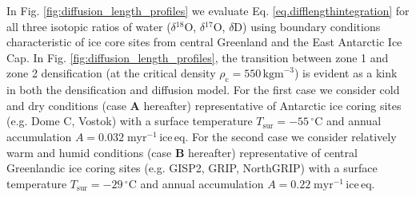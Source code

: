 \documentclass[11pt, draftcls, onecolumn]{IEEEtran} %
\numberwithin{equation}{section}
\numberwithin{table}{section}
\numberwithin{figure}{section}
\newcommand{\delOx}{$\delta{}^{18}\mathrm{O}$}
\newcommand{\delOxb}{$\delta{}^{17}\mathrm{O}$}
\newcommand{\delD}{$\delta\mathrm{D}$}
\begin{document}
In Fig. \ref{fig:diffusion_length_profiles} we evaluate Eq. \ref{eq.difflengthintegration} for all three isotopic ratios 
of water (\delOx, \delOxb, \delD) using boundary conditions characteristic of ice core sites from central Greenland
and the East Antarctic Ice Cap.
In Fig. \ref{fig:diffusion_length_profiles},
the transition between zone 1 and zone 2 densification (at the critical density $\rho_\mathrm{c} = 550\, \mathrm{kg m}^{-3}$) is 
evident as a kink in both the densification and diffusion model.
For the first case we consider cold and dry conditions (case \textbf{A} hereafter)
representative of Antarctic ice coring sites
(e.g. Dome C, Vostok) with a surface temperature $T_{\mathrm{sur}} = -55 \,^{\circ} \mathrm{C}$ and 
annual accumulation $A = 0.032 \;\mathrm{myr^{-1}\, ice\, eq.}$
For the second case we consider relatively warm and humid conditions (case \textbf{B} hereafter)
representative of central Greenlandic ice coring sites
(e.g. GISP2, GRIP, NorthGRIP) with a surface temperature $T_{\mathrm{sur}} = -29 \,^{\circ} \mathrm{C}$ and 
annual accumulation $A = 0.22 \;\mathrm{myr^{-1}\, ice\, eq.}$
\end{document}
